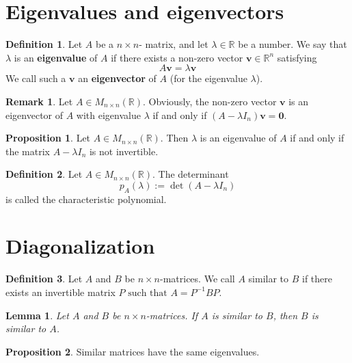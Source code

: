 \documentclass[11pt,a4paper]{article}
\newcommand\R{\mathbb{R}}
\newcommand\vb{\mathbf{v}}
\newcommand\st{\text{ such that }}
\newcommand\inMatrixSq{\in M_{n \times n} (\R)}
\newtheorem{lemma}{Lemma}
\theoremstyle{definition}
\newtheorem{definition}{Definition}
\newtheorem{proposition}{Proposition}
\newtheorem{remark}{Remark}
\begin{document}
\section{Eigenvalues and eigenvectors}

\begin{definition}
    Let $ A $ be a $ n \times n $- matrix, and let $\lambda \in \R $ be a number. We say that $ \lambda $ is an \textbf{eigenvalue} of $ A $ if there exists a non-zero vector
    $ \vb \in \R^n $ satisfying 
    \[ A \vb = \lambda \vb\]
    We call such a $ \vb $ an \textbf{eigenvector} of $ A $ (for the eigenvalue $ \lambda $).
\end{definition}

\begin{remark}
    Let $ A  \inMatrixSq $. Obviously, the non-zero vector $ \vb $ is an eigenvector of $ A $ with eigenvalue $ \lambda $ if and only if $ (A - \lambda I_n)\vb = \mathbf{0} $.
\end{remark}

\begin{proposition}
    Let $ A \inMatrixSq $. Then $ \lambda $ is an eigenvalue of $ A $ if and only if the matrix $ A - \lambda I_n $ is not invertible.
\end{proposition}

\begin{definition}
    Let $ A \inMatrixSq $. The determinant
    \[ p_A(\lambda) := \det(A - \lambda I_n)\]
    is called the characteristic polynomial.
\end{definition}

\section{Diagonalization}

\begin{definition}
    Let $ A $ and $ B $ be $ n \times n $-matrices. We call $ A $ similar to $ B $ if there exists an invertible matrix $ P \st A = P^{-1}BP$. 
\end{definition}

\begin{lemma}
    Let $ A $ and $ B $ be $ n \times n $-matrices. If $A$ is similar to $B$, then $B$ is similar to $A$.
\end{lemma}

\begin{proposition}
    Similar matrices have the same eigenvalues.
\end{proposition}
\end{document}
